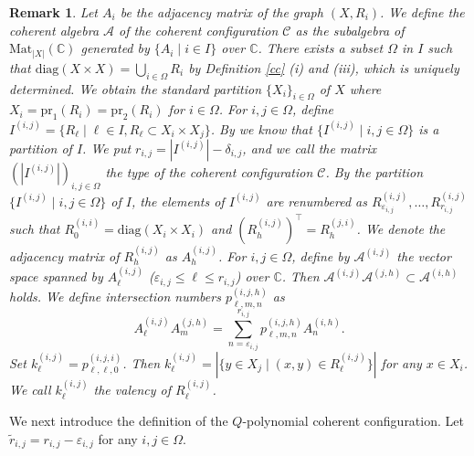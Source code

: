 \documentclass[11pt]{article}
\newtheorem{remark}{Remark}[section]
\theoremstyle{definition}
\theoremstyle{remark}
\begin{document}
\begin{remark}
Let $A_i$ be the adjacency matrix of the graph $(X,R_i)$. 
We define the coherent algebra $\mathcal{A}$ of the coherent configuration $\mathcal{C}$ as the subalgebra of $\mathrm{Mat}_{|X|}(\mathbb{C})$ generated by $\{A_i \mid i\in I\}$ over $\mathbb{C}$. 
There exists a subset $\Omega$ in $I$ such that $\mathrm{diag}(X\times X)=\bigcup_{i\in \Omega}R_i$ by Definition \ref{cc} (i) and (iii), which is uniquely determined.
We obtain the standard partition $\{X_i\}_{i\in \Omega}$ of $X$ where $X_i=\mathrm{pr}_1(R_i)=\mathrm{pr}_2(R_i)$ for $i\in\Omega$. 
For $i,j\in \Omega$, define  
$I^{(i,j)}=\{R_\ell \mid \ell\in I, R_\ell \subset X_i\times X_j\}$. 
By \cite{Hig75} we know that $\{I^{(i,j)}\mid i,j\in\Omega\}$ is a partition of $I$.
We put $r_{i,j}=|I^{(i,j)}|-\delta_{i,j}$, and we call the matrix $(|I^{(i,j)}|)_{i,j\in\Omega}$ the type of the coherent configuration $\mathcal{C}$. 
By the partition $\{I^{(i,j)}\mid i,j\in\Omega\}$ of $I$, the elements of $I^{(i,j)}$ are renumbered as $R_{\varepsilon_{i,j}}^{(i,j)},\ldots,R_{r_{i,j}}^{(i,j)}$ such that $R_0^{(i,i)}=\mathrm{diag}(X_i\times X_i)$ and $(R_h^{(i,j)})^\top =R_h^{(j,i)}$. 
We denote the adjacency matrix of $R_h^{(i,j)}$ as $A_h^{(i,j)}$. 
For $i,j\in \Omega$, define by $\mathcal{A}^{(i,j)}$ the vector space spanned by  $A_\ell^{(i,j)}$ ($\varepsilon_{i,j}\leq \ell \leq r_{i,j}$) over $\mathbb{C}$. 
Then $\mathcal{A}^{(i,j)}\mathcal{A}^{(j,h)}\subset\mathcal{A}^{(i,h)}$ holds.
We define intersection numbers $p_{\ell,m,n}^{(i,j,h)}$ as 
$$
A_\ell^{(i,j)}A_m^{(j,h)}=\sum\limits_{n=\varepsilon_{i,j}}^{r_{i,j}}p_{\ell,m,n}^{(i,j,h)}A_n^{(i,h)}.
$$
Set $k_\ell^{(i,j)}=p_{\ell,\ell,0}^{(i,j,i)}$.
Then $k_\ell^{(i,j)}=|\{y\in X_j\mid (x,y)\in R_\ell^{(i,j)}\}|$ for any $x\in X_i$.
We call $k_\ell^{(i,j)}$ the valency of $R_\ell^{(i,j)}$.
\end{remark}

We next introduce the definition of the $Q$-polynomial coherent configuration. Let $\widetilde{r}_{i,j}=r_{i,j}-\varepsilon_{i,j}$ for any $i,j\in\Omega$. 
\end{document}
